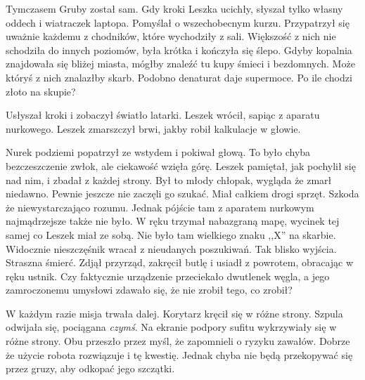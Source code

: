 Tymczasem Gruby został sam. Gdy kroki Leszka ucichły, słyszał tylko własny oddech i wiatraczek laptopa.
Pomyślał o wszechobecnym kurzu.
Przypatrzył się uważnie każdemu z chodników, które wychodziły z sali. Większość z nich nie schodziła do innych poziomów, była krótka i kończyła się ślepo.
Gdyby kopalnia znajdowała się bliżej miasta, mógłby znaleźć tu kupy śmieci i bezdomnych.
Może któryś z nich znalazłby skarb. Podobno denaturat daje supermoce.
Po ile chodzi złoto na skupie?

Usłyszał kroki i zobaczył światło latarki. Leszek wrócił, sapiąc z aparatu nurkowego.
Leszek zmarszczył brwi, jakby robił kalkulacje w głowie.

Nurek podziemi popatrzył ze wstydem i pokiwał głową.
To było chyba bezczeszczenie zwłok, ale ciekawość wzięła górę.
Leszek pamiętał, jak pochylił się nad nim, i zbadał z każdej strony.
Był to młody chłopak, wygląda że zmarł niedawno. Pewnie jeszcze nie zaczęli go szukać.
Miał całkiem drogi sprzęt. Szkoda że niewystarczająco rozumu.
Jednak pójście tam z aparatem nurkowym najmądrzejsze także nie było.
W ręku trzymał nabazgraną mapę, wycinek tej samej co Leszek miał ze sobą.
Nie było tam wielkiego znaku ,,X'' na skarbie.
Widocznie nieszczęśnik wracał z nieudanych poszukiwań.
Tak blisko wyjścia. Straszna śmierć.
Zdjął przyrząd, zakręcił butlę i usiadł z powrotem, obracając w ręku ustnik.
Czy faktycznie urządzenie przeciekało dwutlenek węgla, a jego zamroczonemu umysłowi zdawało się, że nie zrobił tego, co zrobił?

W każdym razie misja trwała dalej.
Korytarz kręcił się w różne strony. Szpula odwijała się, pociągana \emph{czymś}.
Na ekranie podpory sufitu wykrzywiały się w różne strony.
Obu przeszło przez myśl, że zapomnieli o ryzyku zawałów. Dobrze że użycie robota rozwiązuje i tę kwestię.
Jednak chyba nie będą przekopywać się przez gruzy, aby odkopać jego szczątki.

